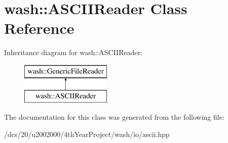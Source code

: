 \hypertarget{classwash_1_1ASCIIReader}{}\section{wash\+:\+:A\+S\+C\+I\+I\+Reader Class Reference}
\label{classwash_1_1ASCIIReader}
Inheritance diagram for wash\+:\+:A\+S\+C\+I\+I\+Reader\+:\begin{figure}[H]
\begin{center}
\leavevmode
\includegraphics[height=2.000000cm]{classwash_1_1ASCIIReader}
\end{center}
\end{figure}


The documentation for this class was generated from the following file\+:\begin{DoxyCompactItemize}
\item 
/dcs/20/u2002000/4th\+Year\+Project/wash/io/ascii.\+hpp\end{DoxyCompactItemize}
